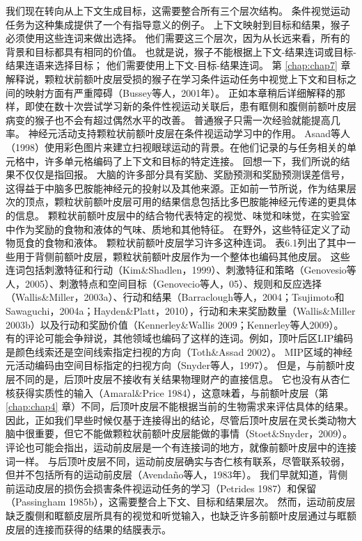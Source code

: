 我们现在转向从上下文生成目标，这需要整合所有三个层次结构。
条件视觉运动任务为这种集成提供了一个有指导意义的例子。
上下文映射到目标和结果，猴子必须使用这些连词来做出选择。
他们需要这三个层次，因为从长远来看，所有的背景和目标都具有相同的价值。
也就是说，猴子不能根据上下文-结果连词或目标-结果连语来选择目标；
他们需要使用上下文-目标-结果连词。
第 \ref{chap:chap7} 章解释说，颗粒状前额叶皮层受损的猴子在学习条件运动任务中视觉上下文和目标之间的映射方面有严重障碍（Bussey等人，2001年）。
正如本章稍后详细解释的那样，即使在数十次尝试学习新的条件性视运动关联后，患有眶侧和腹侧前额叶皮层病变的猴子也不会有超过偶然水平的改善。
普通猴子只需一次经验就能提高几率。
神经元活动支持颗粒状前额叶皮层在条件视运动学习中的作用。
Asaad等人（1998）使用彩色图片来建立扫视眼球运动的背景。在他们记录的与任务相关的单元格中，许多单元格编码了上下文和目标的特定连接。
回想一下，我们所说的结果不仅仅是指回报。
大脑的许多部分具有奖励、奖励预测和奖励预测误差信号，这得益于中脑多巴胺能神经元的投射以及其他来源。正如前一节所说，作为结果层次的顶点，颗粒状前额叶皮层可用的结果信息包括比多巴胺能神经元传递的更具体的信息。
颗粒状前额叶皮层中的结合物代表特定的视觉、味觉和味觉，在实验室中作为奖励的食物和液体的气味、质地和其他特征。
在野外，这些特征定义了动物觅食的食物和液体。
颗粒状前额叶皮层学习许多这种连词。
表6.1列出了其中一些用于背侧前额叶皮层，颗粒状前额叶皮层作为一个整体也编码其他皮层。
这些连词包括刺激特征和行动（Kim\&Shadlen，1999）、刺激特征和策略（Genovesio等人，2005）、刺激特点和空间目标（Genovecio等人，05）、规则和反应选择（Wallis\&Miller，2003a）、行动和结果（Barraclough等人，2004；Tsujimoto和Sawaguchi，2004a；Hayden\&Platt，2010），行动和未来奖励数量（Wallis\&Miller 2003b）以及行动和奖励价值（Kennerley\&Wallis 2009；Kennerley等人2009）。
有的评论可能会争辩说，其他领域也编码了这样的连词。例如，顶叶后区LIP编码是颜色线索还是空间线索指定扫视的方向（Toth\&Assad 2002）。
MIP区域的神经元活动编码由空间目标指定的扫视方向（Snyder等人，1997）。
但是，与前额叶皮层不同的是，后顶叶皮层不接收有关结果物理财产的直接信息。
它也没有从杏仁核获得实质性的输入（Amaral\&Price 1984），这意味着，与前额叶皮层（第 \ref{chap:chap4} 章）不同，后顶叶皮层不能根据当前的生物需求来评估具体的结果。
因此，正如我们早些时候仅基于连接得出的结论，尽管后顶叶皮层在灵长类动物大脑中很重要，但它不能做颗粒状前额叶皮层能做的事情（Stoet\&Snyder，2009）。
评论也可能会指出，运动前皮层是一个有连接词的地方，就像前额叶皮层中的连接词一样。
与后顶叶皮层不同，运动前皮层确实与杏仁核有联系，尽管联系较弱，但并不包括所有的运动前皮层（Avendaño等人，1983年）。
我们早就知道，背侧前运动皮层的损伤会损害条件视运动任务的学习（Petrides 1987）和保留（Passingham 1985b），这需要整合上下文、目标和结果层次。
然而，运动前皮层缺乏腹侧和眶额皮层所具有的视觉和听觉输入，也缺乏许多前额叶皮层通过与眶额皮层的连接而获得的结果的结膜表示。


